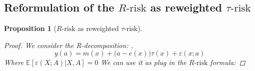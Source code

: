 \documentclass[11pt]{article}
\let\cite=\supercite
\newtheorem{proposition*}{Proposition}
\newtheorem{proof}{Proof}
\begin{document}
\begin{appendices}



    \subsection{Reformulation of the $R\text{-risk}$ as reweighted
        $\tau\text{-risk}$}\label{apd:proofs:r_risk_rewrite}

    \begin{proposition*}[$R\text{-risk}$ as reweighted $\tau
                \text{-risk}$]\label{apd:proofs:prop:r_risk_rewrite}

        \begin{proof}

            We consider the R-decomposition: \cite{robinson_rootnconsistent_1988},
            \begin{equation}\label{apd:eq:r_decomposition}
                y(a) = m(x) + \big( a - e(x) \big) \tau(x) + \varepsilon(x; a)
            \end{equation}
            Where $\mathbb E[\varepsilon(X; A)|X, A] = 0$ We can use it as plug in the
            $R\text{-risk}$ formula:


\end{proof}
\end{proposition*}
\end{appendices}
\end{document}
